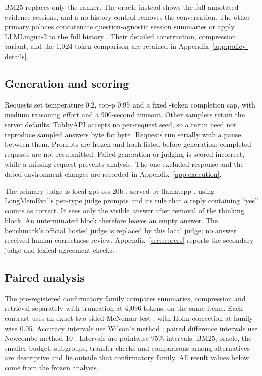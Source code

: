 \documentclass[11pt,letterpaper]{article}
\newcommand{\PfiveLargeBudget}{4,096}
\newcommand{\PfiveSmallBudget}{1,024}
\newcommand{\PfiveTemperature}{0.2}
\newcommand{\PfiveTopP}{0.95}
\newcommand{\PfiveTimeout}{900}
\newcommand{\PfiveConfidence}{95}
\newcommand{\PfiveAlpha}{0.05}
\begin{document}
BM25 \citep{robertson2009bm25} replaces only the ranker. The oracle instead
shows the full annotated evidence sessions, and a no-history control removes
the conversation. The other primary policies concatenate question-agnostic
session summaries or apply LLMLingua-2 to the full history
\citep{pan2024llmlingua2}. Their detailed construction, compression variant,
and the \PfiveSmallBudget{}-token comparison are retained in
Appendix~\ref{app:policy-details}.

\subsection{Generation and scoring}
Requests set temperature \PfiveTemperature{}, top-p \PfiveTopP{} and a fixed
\PfiveCap{}-token completion cap, with medium reasoning effort and a
\PfiveTimeout{}-second timeout. Other samplers retain the server defaults.
TabbyAPI accepts no per-request seed, so a rerun need not reproduce sampled
answers byte for byte. Requests run serially with a pause between them.
Prompts are frozen and hash-listed before generation; completed requests are
not resubmitted. Failed generation or judging is scored incorrect, while a
missing request prevents analysis. The one excluded response and the dated
environment changes are recorded in Appendix~\ref{app:execution}.

The primary judge is local gpt-oss-20b \citep{openai2025gptoss}, served by
llama.cpp \citep{gerganov2023llamacpp}, using LongMemEval's per-type judge
prompts and its rule that a reply containing ``yes'' counts as correct. It
sees only the visible answer after removal of the thinking block. An
unterminated block therefore leaves an empty answer. The benchmark's official
hosted judge is replaced by this local judge; no answer received human
correctness review. Appendix~\ref{sec:scorers} reports the secondary judge and
lexical agreement checks.

\subsection{Paired analysis}
The pre-registered confirmatory family compares summaries, compression and
retrieval separately with truncation at \PfiveLargeBudget{} tokens, on the
same \PfNMFour{} items. Each contrast uses an exact two-sided McNemar test
\citep{mcnemar1947}, with Holm correction \citep{holm1979} at family-wise
\PfiveAlpha{}. Accuracy intervals use Wilson's method \citep{wilson1927};
paired difference intervals use Newcombe method 10 \citep{newcombe1998paired}.
Intervals are pointwise \PfiveConfidence\% intervals. BM25, oracle, the smaller
budget, subgroups, transfer checks and comparisons among alternatives are
descriptive and lie outside that confirmatory family. All result values below
come from the frozen analysis.
\end{document}
